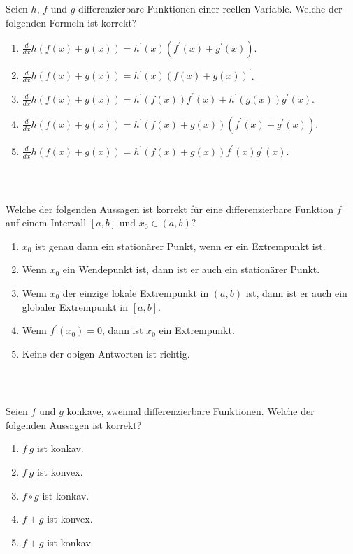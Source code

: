 \subsection*{}
Seien $h$, $f$ und $g$ differenzierbare Funktionen einer reellen Variable. Welche der folgenden Formeln ist korrekt?
\renewcommand{\labelenumi}{(\alph{enumi})}
\begin{enumerate}
	\item 
	$ \frac{d}{dx}h(f(x) + g(x)) = h^\prime(x) ( f^\prime(x) + g^\prime(x))$.
	\item 
	$ \frac{d}{dx}h(f(x) + g(x)) = h^\prime(x) ( f(x) + g(x))^\prime$.
	\item
	$ \frac{d}{dx}h(f(x) + g(x)) = h^\prime(f(x))  f^\prime(x) + h^\prime(g(x)) g^\prime(x)$.
	\item
	$ \frac{d}{dx}h(f(x) + g(x)) = h^\prime(f(x) + g(x))  (f^\prime(x) +  g^\prime(x) )$.
	\item
	$ \frac{d}{dx}h(f(x) + g(x)) = h^\prime(f(x) + g(x))  f^\prime(x)  g^\prime(x)$.
\end{enumerate}
\ \\
\subsection*{}
Welche der folgenden Aussagen ist korrekt für eine differenzierbare Funktion $f$ auf einem Intervall $[a,b]$ und $x_0 \in (a,b)$?
\renewcommand{\labelenumi}{(\alph{enumi})}
\begin{enumerate}
\item 
$x_0$ ist genau dann ein stationärer Punkt, wenn er ein Extrempunkt ist.
\item
Wenn $x_0$ ein Wendepunkt ist, dann ist er auch ein stationärer Punkt.
\item
Wenn $x_0$ der einzige lokale Extrempunkt in $(a,b)$ ist, dann ist er auch ein globaler Extrempunkt in $[a,b]$.
\item
Wenn $f^\prime(x_0) = 0$, dann ist $x_0$ ein Extrempunkt.
\item
Keine der obigen Antworten ist richtig.
\end{enumerate}
\ \\
\subsection*{}
Seien $f$ und $g$ konkave, zweimal differenzierbare Funktionen. Welche der folgenden Aussagen ist korrekt?
\renewcommand{\labelenumi}{(\alph{enumi})}
\begin{enumerate}
	\item 
	$f \ g$ ist konkav.
 	\item
	$f \ g$ ist konvex.
	\item
	$f \circ g $ ist konkav.
	\item
	$f +g $ ist konvex.
	\item 
	$f+g$ ist konkav.
\end{enumerate}
\ \\
